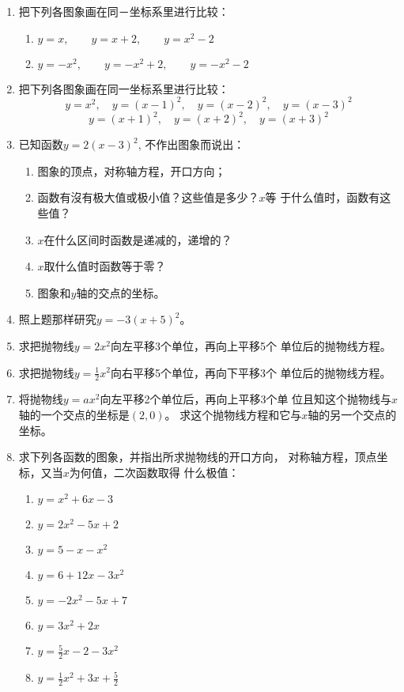 \begin{enumerate}
    \item 把下列各图象画在同－坐标系里进行比较：
\begin{enumerate}
    \item $y=x,\qquad  y=x+2,\qquad  y=x^2-2$
    \item $y=-x^2,\qquad y=-x^2+2,\qquad y=-x^2-2$
\end{enumerate}

    \item 把下列各图象画在同一坐标系里进行比较：
  \[  y=x^2,\quad     y=(x-1)^2,\quad    y=(x-2)^2,\quad     y=(x-3)^2\]
 \[   y=(x+1)^2,\quad     y=(x+2)^2,\quad     y=(x+3)^2\]
    \item 已知函数$y=2(x-3)^2$, 不作出图象而说出：
\begin{enumerate}
\item 图象的顶点，对称轴方程，开口方向；
\item 函数有沒有极大值或极小值？这些值是多少？$x$等
    于什么值时，函数有这些值？
    \item $x$在什么区间时函数是递减的，递增的？
    \item $x$取什么值时函数等于零？
    \item 图象和$y$轴的交点的坐标。
\end{enumerate}

    \item 照上题那样研究$y=-3(x+5)^2$。
    \item 求把抛物线$y=2x^2$向左平移3个单位，再向上平移5个
    单位后的抛物线方程。
    \item 求把抛物线$y=\frac{1}{2}x^2$向右平移5个单位，再向下平移3个
    单位后的抛物线方程。
    \item 将抛物线$y=ax^2$向左平移2个单位后，再向上平移3个单
    位且知这个抛物线与$x$轴的一个交点的坐标是$(2,0)$。
    求这个抛物线方程和它与$x$轴的另一个交点的坐标。
    \item 求下列各函数的图象，并指出所求抛物线的开口方向，
    对称轴方程，顶点坐标，又当$x$为何值，二次函数取得
    什么极值：
\begin{multicols}{2}
    \begin{enumerate}
        \item $y=x^2+6x-3$
        \item $y=2x^2-5x+2$
        \item $y=5-x-x^2$
        \item $y=6+12x-3x^2$
        \item $y=-2x^2-5x+7$
        \item $y=3x^2+2x$
        \item $y=\frac{5}{2}x-2-3x^2$
        \item $y=\frac{1}{2}x^2+3x+\frac{5}{2}$
    \end{enumerate}
\end{multicols}


\end{enumerate}

